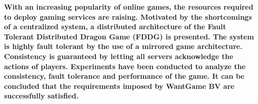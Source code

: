 \textbf{With an increasing popularity of online games, the resources required to deploy gaming services are raising.
	Motivated by the shortcomings of a centralized system, a distributed architecture of the Fault Tolerant Distributed Dragon Game (FDDG) is presented. 
	The system is highly fault tolerant by the use of a mirrored game architecture. 
	Consistency is guaranteed by letting all servers acknowledge the actions of  players. 
	Experiments have been conducted to analyze the consistency, fault tolerance and performance of the game. 
	It can be concluded that the requirements imposed by WantGame BV are successfully satisfied.}